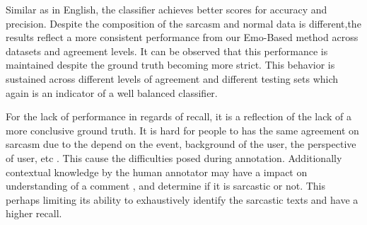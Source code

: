 \documentclass[12pt,a4paper]{report}
\theoremstyle{definition}
\begin{document}
\begin{CJK}{UTF8}{bsmi}
        \par Similar as in English, the classifier achieves better scores for accuracy and precision. Despite the composition of the sarcasm and normal data is different,the results reflect a more consistent performance from our Emo-Based method across datasets and agreement levels. It can be observed that this performance is maintained despite the ground truth becoming more strict.
        This behavior is sustained across different levels of agreement and different testing sets which again is an indicator of a well balanced classifier.
        \par For the  lack of performance in regards of recall, it is a reflection of the lack of a more conclusive ground truth. It is hard for people to has the same agreement on sarcasm due to the depend on the event, background of the user, the perspective of user, etc . This cause the difficulties posed during annotation. Additionally contextual knowledge by the human annotator may have a impact on understanding of a comment , and determine if it is sarcastic or not.  
        This perhaps limiting its ability to exhaustively identify the sarcastic texts and have a higher recall.

\end{CJK}
\end{document}
